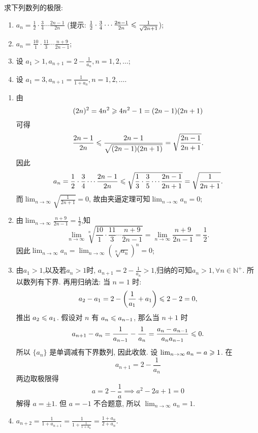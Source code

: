 \begin{exercise}[1.C.1]
    求下列数列的极限:
    \begin{enumerate}
        \item $a_n = \frac{1}{2} \cdot \frac{3}{4} \cdots \frac{2n-1}{2n}$ (提示: $\frac{1}{2} \cdot \frac{3}{4} \cdots \frac{2n-1}{2n} \leqslant \frac{1}{\sqrt{2n+1}}$);
        \item $a_n = \frac{10}{1} \cdot \frac{11}{3} \cdots \frac{n+9}{2n-1}$;
        \item 设 $a_1 > 1, a_{n+1} = 2 - \frac{1}{a_n}, n=1,2,\dots$;
        \item 设 $a_1 = 3, a_{n+1} = \frac{1}{1+a_n}, n=1,2,\dots$.
    \end{enumerate}
\end{exercise}

\begin{solution}
    \begin{enumerate}
        \item 由$$(2n)^2 = 4n^2 \geqslant 4n^2 - 1 = (2n-1)(2n+1)$$可得$$\frac{2n-1}{2n} \leqslant \frac{2n-1}{\sqrt{(2n-1)(2n+1)}} = \sqrt{\frac{2n-1}{2n+1}}.$$因此$$a_n = \frac{1}{2} \cdot \frac{3}{4} \cdots \frac{2n-1}{2n} \leqslant \sqrt{\frac{1}{3} \cdot \frac{3}{5} \cdots \frac{2n-1}{2n+1}} = \sqrt{\frac{1}{2n+1}}.$$
              而$\lim_{n\to\infty} \sqrt{\frac{1}{2n+1}} = 0$, 故由夹逼定理可知$\lim_{n\to\infty} a_n = 0$;
        \item 由$\lim_{n \to \infty} \frac{n+9}{2n-1} = \frac{1}{2}$,知$$\lim_{n\to\infty} \sqrt[n]{\frac{10}{1} \cdot \frac{11}{3} \cdots \frac{n+9}{2n-1}} = \lim_{n\to\infty} \frac{n+9}{2n-1} = \frac{1}{2}.$$
              因此$\lim_{n\to\infty} a_n = \lim_{n\to\infty} \left(\sqrt[n]{a_n}\right)^n = 0$;
        \item 由$a_1 > 1$,以及若$a_n > 1$时, $a_{n+1} = 2 - \frac{1}{a_n} > 1$,归纳的可知$a_n > 1, \forall n \in \mathbb{N}^+$. 所以数列有下界. 再用归纳法: 当 $n=1$ 时:
              $$ a_2 - a_1 = 2 - \left(\frac{1}{a_1} + a_1\right) \leqslant 2-2=0, $$
              推出 $a_2 \leqslant a_1$. 假设对 $n$ 有 $a_n \leqslant a_{n-1}$, 那么当 $n+1$ 时
              $$ a_{n+1} - a_n = \frac{1}{a_{n-1}} - \frac{1}{a_n} = \frac{a_n - a_{n-1}}{a_n a_{n-1}} \leqslant 0. $$
              所以 $\{a_n\}$ 是单调减有下界数列, 因此收敛. 设 $\lim_{n \to \infty} a_n = a \geqslant 1$. 在
              $$ a_{n+1} = 2 - \frac{1}{a_n} $$
              两边取极限得
              $$ a = 2 - \frac{1}{a} \implies a^2 - 2a + 1 = 0 $$
              解得 $a=\pm 1$. 但 $a=-1$ 不合题意, 所以 $\lim_{n \to \infty} a_n = 1$.
        \item $a_{n+2} = \frac{1}{1+a_{n+1}} = \frac{1}{1+\frac{1}{1+a_n}} = \frac{1+a_n}{2+a_n}$. 

\end{enumerate}
\end{solution}
